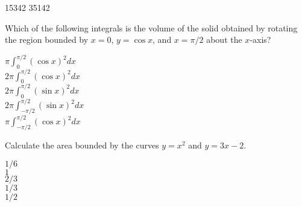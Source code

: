 \documentclass[12pt]{amsart}
\begin{document}
\runType[final]

\begin{answersheetmatter}
\whichCourse[Math 10550] \whichExam[Quiz I]
\dateOfExam[11/29/2011]
\lengthOfTimeForExam[5  min]

\begin{multiplechoiceStyle}[dotted]
 15342   35142 
\end{multiplechoiceStyle}
\end{answersheetmatter}


\makeanswersheet[]

\begin{exam}
\multiplechoiceStart[2 pts.]

\gdef\dxd{\displaystyle}


\begin{problem}
    Which of the following integrals is the volume of the solid obtained by
    rotating the region bounded by $x=0$, $y = \cos x$, and $x = \pi/2$ about
    the $x$-axis?
\begin{answers}{1}
 $\pi \int_{0}^{\pi/2 } (\cos x)^{2} dx$ \\
 $2 \pi \int_{0}^{\pi/2 } (\cos x)^{2} dx$ \\
$2 \pi \int_{0}^{\pi/2 } (\sin x)^{2} dx$ \\
$2 \pi \int_{-\pi/2}^{\pi/2 } (\sin x)^{2} dx$ \\
$\pi \int_{-\pi/2}^{\pi/2 } (\cos x)^{2} dx$ \\
\end{answers}
\end{problem}

\begin{problem}
  Calculate the area bounded by the curves $y = x^{2}$ and $y = 3x - 2$.
\begin{answers}{1}
$1/6$\\
$1$ \\
$2/3$ \\
$1/3$\\
$1/2$\\
\end{answers}
\end{problem}



\end{exam}

\makemarkedanswersheet

\showSolutions
\end{document}
